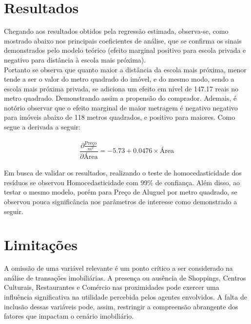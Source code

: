 

\section{Resultados}
Chegando aos resultados obtidos pela regressão estimada, observa-se, como mostrado abaixo nos principais coeficientes de análise, que se confirma os sinais demonstrados pelo modelo teórico (efeito marginal positivo para escola privada e negativo para distância à escola mais próxima).
\\

Portanto se observa que quanto maior a distância da escola mais próxima, menor tende a ser o valor do metro quadrado do imóvel, e do mesmo modo, sendo a escola mais próxima privada, se adiciona um efeito em nível de 147.17 reais no metro quadrado. Demonstrando assim a propensão do comprador. Ademais, é notório observar que o efeito marginal de maior metragem é negativo negativo para imóveis abaixo de 118 metros quadrados, e positivo para maiores. Como segue a derivada a seguir:
\\\\
$$
\frac{\partial \frac{\text{Preço}}{m^2}}{\partial \text{Área}} = -5.73 + 0.0476 \times \text{Área}
$$
\\
Em busca de validar os resultados, realizando o teste de homocedasticidade dos resíduos se observou Homocedasticidade com 99\% de confiança.
Além disso, ao testar o mesmo modelo, porém para Preço de Aluguel por metro quadrado, se observou pouca significância nos parâmetros de interesse como demonstrado a seguir.




\section{Limitações}

A omissão de uma variável relevante é um ponto crítico a ser considerado na análise de transações imobiliárias. A presença ou ausência de Shoppings, Centros Culturais, Restaurantes e Comércio nas proximidades pode exercer uma influência significativa na utilidade percebida pelos agentes envolvidos. A falta de inclusão dessas variáveis pode, assim, restringir a compreensão abrangente dos fatores que impactam o cenário imobiliário.

